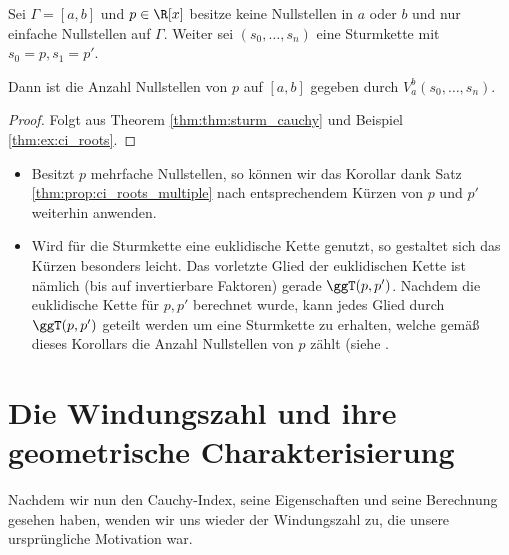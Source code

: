 \documentclass{mythesis}
\begin{document}
\begin{corollary} \label{thm:cor:sturm}
    Sei $\Gamma = [a,b]$ und $p \in \R[x]$ besitze keine Nullstellen in $a$ oder $b$ und nur einfache Nullstellen auf $\Gamma$.
    Weiter sei $(s_0, \dotsc, s_n)$ eine Sturmkette mit $s_0 = p, s_1 = p'$.

    Dann ist die Anzahl Nullstellen von $p$ auf $[a,b]$ gegeben durch $V_a^b(s_0, \dotsc, s_n)$.
    \begin{proof}
        Folgt aus Theorem \ref{thm:thm:sturm_cauchy} und Beispiel \ref{thm:ex:ci_roots}.
    \end{proof}
    \begin{note}
        \begin{itemize}
            \item
                Besitzt $p$ mehrfache Nullstellen, so können wir das Korollar dank Satz \ref{thm:prop:ci_roots_multiple} nach entsprechendem Kürzen von $p$ und $p'$ weiterhin anwenden.
            \item
                Wird für die Sturmkette eine euklidische Kette genutzt, so gestaltet sich das Kürzen besonders leicht.
                Das vorletzte Glied der euklidischen Kette ist nämlich (bis auf invertierbare Faktoren) gerade $\ggT(p, p')$.
                Nachdem die euklidische Kette für $p, p'$ berechnet wurde, kann jedes Glied durch $\ggT(p, p')$ geteilt werden um eine Sturmkette zu erhalten, welche gemäß dieses Korollars die Anzahl Nullstellen von $p$ zählt (siehe \cite[Definition 3.13]{eisermann2012fundamental}.
        \end{itemize}
    \end{note}
\end{corollary}


\section{Die Windungszahl und ihre geometrische Charakterisierung} \label{sec:wn_geom}

Nachdem wir nun den Cauchy-Index, seine Eigenschaften und seine Berechnung gesehen haben, wenden wir uns wieder der Windungszahl zu, die unsere ursprüngliche Motivation war.
\end{document}
